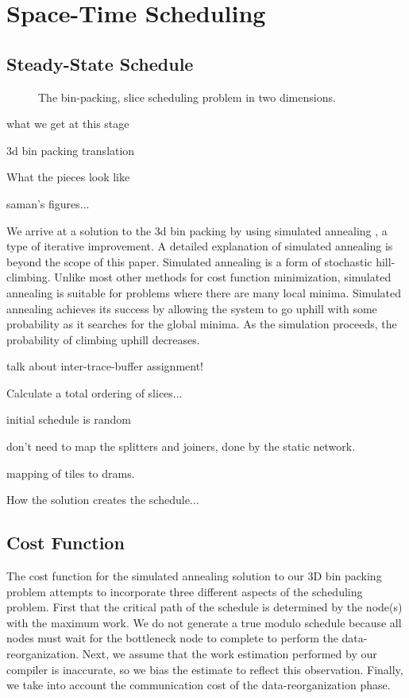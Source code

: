 \section{Space-Time Scheduling}
\label{sec:scheduling}
\subsection{Steady-State Schedule}

\begin{figure}
\centering
{}
\caption{The bin-packing, slice scheduling problem in two dimensions.
\protect\label{fig:2d}}
\end{figure}

what we get at this stage

3d bin packing translation

What the pieces look like 

saman's figures...

We arrive at a solution to the 3d bin packing by using simulated
annealing \cite{simanneal}, a type of iterative improvement.  A
detailed explanation of simulated annealing is beyond the scope of
this paper.  Simulated annealing is a form of stochastic
hill-climbing. Unlike most other methods for cost function
minimization, simulated annealing is suitable for problems where there
are many local minima.  Simulated annealing achieves its success by
allowing the system to go uphill with some probability as it searches
for the global minima.  As the simulation proceeds, the probability of
climbing uphill decreases.

talk about inter-trace-buffer assignment!

Calculate a total ordering of slices...

initial schedule is random

don't need to map the splitters and joiners, done by the static network.

mapping of tiles to drams.

How the solution creates the schedule...

\subsection{Cost Function}
The cost function for the simulated annealing solution to our 3D bin
packing problem attempts to incorporate three different aspects of the
scheduling problem.  First that the critical path of the schedule is
determined by the node(s) with the maximum work.  We do not generate a
true modulo schedule because all nodes must wait for the bottleneck
node to complete to perform the data-reorganization.  Next, we assume
that the work estimation performed by our compiler is inaccurate, so
we bias the estimate to reflect this observation.  Finally, we take
into account the communication cost of the data-reorganization phase.

